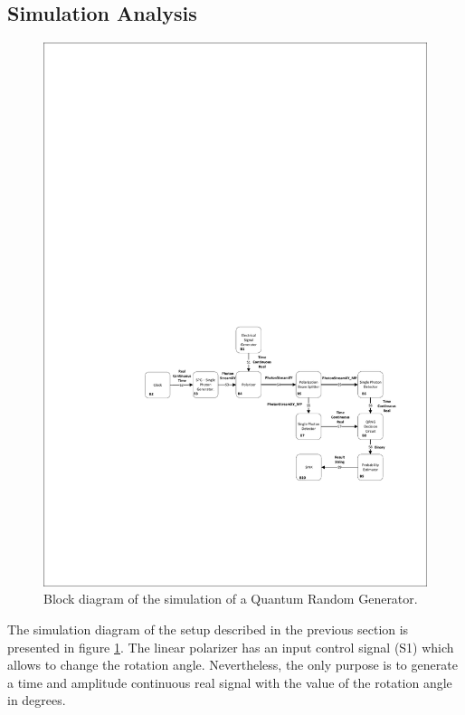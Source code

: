 \subsection{Simulation Analysis}

\begin{figure}[h]
    \centering
        \includegraphics[clip, trim=5cm 5cm 0.5cm 15cm, width=1.00\textwidth]{./sdf/qrng/figures_raw/Simulation_qrng.pdf}
    \caption{Block diagram of the simulation of a Quantum Random Generator.}\label{sim_qrng}
\end{figure}

The simulation diagram of the setup described in the previous section is presented in figure \ref{sim_qrng}. The linear polarizer has an input control signal (S1) which allows to change the rotation angle. Nevertheless, the only purpose is to generate a time and amplitude continuous real signal with the value of the rotation angle in degrees.

